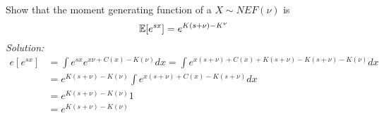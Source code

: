 \begin{ex}
	Show that the moment generating function of a \rv $X\sim NEF(\nu)$ is
	$$\mathbb{E}[e^{sx}]=e^{K(s+\nu)-K^\nu}$$
\textit{Solution:}
\[
\begin{split}
e[e^{sx}]
&=\int e^{sx}e^{x\nu+C(x)-K(\nu)}dx=\int e^{x(s+\nu)+C(x)+K(s+\nu)-K(s+\nu)-K(\nu)}dx\\
&=e^{K(s+\nu)-K(\nu)}\int e^{x(s+\nu)+C(x)-K(s+\nu)}dx\\
&=e^{K(s+\nu)-K(\nu)} 1\\
&=e^{K(s+\nu)-K(\nu)}
	\end{split}
	\]
\end{ex}
